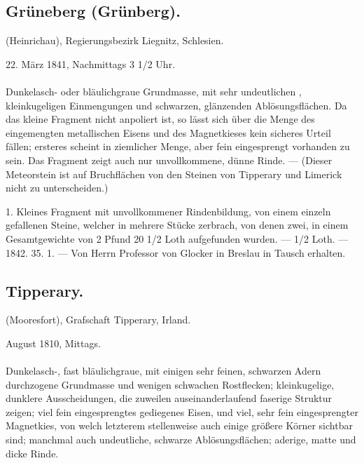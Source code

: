 \documentclass[a4paper, 11pt, oneside, polutonikogreek, german]{article}
\begin{document}
\subsection{Grüneberg (Grünberg).}
\begin{center}
\small
(Heinrichau), Regierungsbezirk Liegnitz, Schlesien.

22. März 1841, Nachmittags 3 1/2 Uhr.
\end{center}
\paragraph{}
Dunkelasch- oder bläulichgraue Grundmasse, mit sehr undeutlichen , kleinkugeligen Einmengungen und schwarzen, glänzenden Ablösungsflächen. Da das kleine Fragment nicht anpoliert ist, so lässt sich über die Menge des eingemengten metallischen Eisens und des Magnetkieses kein sicheres Urteil fällen; ersteres scheint in ziemlicher Menge, aber fein eingesprengt vorhanden zu sein. Das Fragment zeigt auch nur unvollkommene, dünne Rinde. — (Dieser Meteorstein ist auf Bruchflächen von den Steinen von Tipperary und Limerick nicht zu unterscheiden.)

1. Kleines Fragment mit unvollkommener Rindenbildung, von einem einzeln gefallenen Steine, welcher in mehrere Stücke zerbrach, von denen zwei, in einem Gesamtgewichte von 2 Pfund 20 1/2 Loth aufgefunden wurden. — 1/2 Loth. — 1842. 35. 1. — Von Herrn Professor von Glocker in Breslau in Tausch erhalten.
\subsection{Tipperary.}
\begin{center}
\small
(Mooresfort), Grafschaft Tipperary, Irland.

August 1810, Mittags.
\end{center}
\paragraph{}
Dunkelasch-, fast bläulichgraue, mit einigen sehr feinen, schwarzen Adern durchzogene Grundmasse und wenigen schwachen Rostflecken; kleinkugelige, dunklere Ausscheidungen, die zuweilen auseinanderlaufend faserige Struktur zeigen; viel fein eingesprengtes gediegenes Eisen, und viel, sehr fein eingesprengter Magnetkies, von welch letzterem stellenweise auch einige größere Körner sichtbar sind; manchmal auch undeutliche, schwarze Ablösungsflächen; aderige, matte und dicke Rinde.
\end{document}
